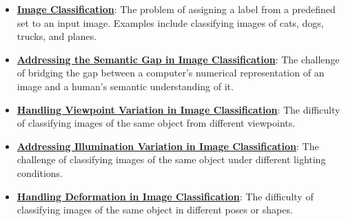 \documentclass{article}%
\begin{document}
\begin{itemize}[leftmargin=*]%
\item \href{https://purdue.brightspace.com/d2l/common/assets/pdfjs-d2l-dist/1.0.14-legacy/web/viewer.html?file=\%2Fcontent\%2Fenforced\%2F1095467-wl.202510.CS.24300.001\%2F07L2-Vision.pdf\%3Fou\%3D1095467\&lang=en-us\&container=d2l-fileviewer-rendered-pdf\&fullscreen=d2l-fileviewer-rendered-pdf-dialog\&height=667#page=3}{\textbf{Image Classification}}: The problem of assigning a label from a predefined set to an input image. Examples include classifying images of cats, dogs, trucks, and planes.%
\item \href{https://purdue.brightspace.com/d2l/common/assets/pdfjs-d2l-dist/1.0.14-legacy/web/viewer.html?file=\%2Fcontent\%2Fenforced\%2F1095467-wl.202510.CS.24300.001\%2F07L2-Vision.pdf\%3Fou\%3D1095467\&lang=en-us\&container=d2l-fileviewer-rendered-pdf\&fullscreen=d2l-fileviewer-rendered-pdf-dialog\&height=667#page=4}{\textbf{Addressing the Semantic Gap in Image Classification}}: The challenge of bridging the gap between a computer's numerical representation of an image and a human's semantic understanding of it.%
\item \href{https://purdue.brightspace.com/d2l/common/assets/pdfjs-d2l-dist/1.0.14-legacy/web/viewer.html?file=\%2Fcontent\%2Fenforced\%2F1095467-wl.202510.CS.24300.001\%2F07L2-Vision.pdf\%3Fou\%3D1095467\&lang=en-us\&container=d2l-fileviewer-rendered-pdf\&fullscreen=d2l-fileviewer-rendered-pdf-dialog\&height=667#page=6}{\textbf{Handling Viewpoint Variation in Image Classification}}: The difficulty of classifying images of the same object from different viewpoints.%
\item \href{https://purdue.brightspace.com/d2l/common/assets/pdfjs-d2l-dist/1.0.14-legacy/web/viewer.html?file=\%2Fcontent\%2Fenforced\%2F1095467-wl.202510.CS.24300.001\%2F07L2-Vision.pdf\%3Fou\%3D1095467\&lang=en-us\&container=d2l-fileviewer-rendered-pdf\&fullscreen=d2l-fileviewer-rendered-pdf-dialog\&height=667#page=7}{\textbf{Addressing Illumination Variation in Image Classification}}: The challenge of classifying images of the same object under different lighting conditions.%
\item \href{https://purdue.brightspace.com/d2l/common/assets/pdfjs-d2l-dist/1.0.14-legacy/web/viewer.html?file=\%2Fcontent\%2Fenforced\%2F1095467-wl.202510.CS.24300.001\%2F07L2-Vision.pdf\%3Fou\%3D1095467\&lang=en-us\&container=d2l-fileviewer-rendered-pdf\&fullscreen=d2l-fileviewer-rendered-pdf-dialog\&height=667#page=8}{\textbf{Handling Deformation in Image Classification}}: The difficulty of classifying images of the same object in different poses or shapes.%

\end{itemize}
\end{document}
